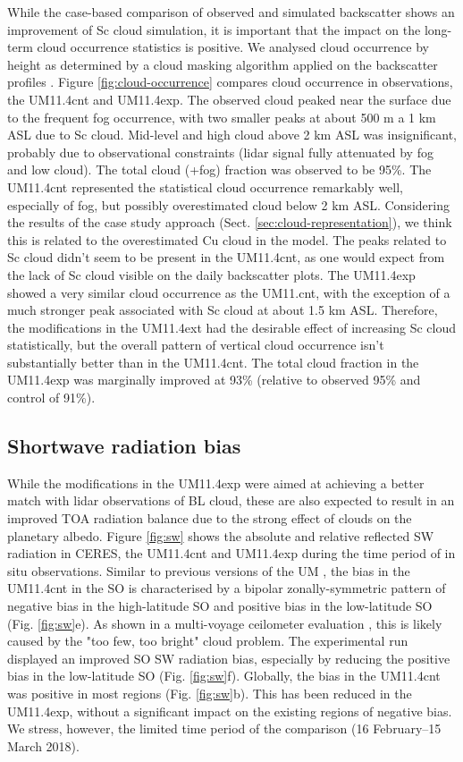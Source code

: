 While the case-based comparison of observed and simulated backscatter
shows an improvement of Sc cloud simulation, it is important that the impact
on the long-term cloud occurrence statistics is positive. We analysed
cloud occurrence by height as determined by a cloud masking algorithm
applied on the backscatter profiles \citep{kuma2020}.
Figure \ref{fig:cloud-occurrence} compares cloud occurrence in observations,
the UM11.4cnt and UM11.4exp. The observed cloud peaked near the surface due to
the frequent fog occurrence,
with two smaller peaks at about 500 m a 1 km ASL due to Sc cloud.
Mid-level and high cloud above 2 km ASL was insignificant, probably due
to observational constraints (lidar signal fully attenuated by fog and low
cloud). The total cloud (+fog) fraction was observed to be 95\%.
The UM11.4cnt represented the statistical cloud occurrence remarkably well,
especially of fog, but possibly overestimated cloud below 2 km ASL. Considering
the results of the case study approach (Sect. \ref{sec:cloud-representation}), we think this is related to the
overestimated Cu cloud in the model. The peaks related to Sc cloud didn't seem
to be present in the UM11.4cnt, as one would expect from the lack of Sc cloud
visible on the daily backscatter plots. The UM11.4exp showed a very similar
cloud occurrence as the UM11.cnt, with the exception of a much stronger peak
associated with Sc cloud at about 1.5 km ASL. Therefore, the modifications
in the UM11.4ext had the desirable effect of increasing Sc cloud statistically,
but the overall pattern of vertical cloud occurrence isn't substantially better
than in the UM11.4cnt. The total cloud fraction in the UM11.4exp was marginally
improved at 93\% (relative to observed 95\% and control of 91\%).

\subsection{Shortwave radiation bias}
\label{sec:sw-bias}

While the modifications in the UM11.4exp were aimed at achieving a better
match with lidar observations of BL cloud, these are also expected to
result in an improved TOA radiation balance due to the strong effect of
clouds on the planetary albedo. Figure \ref{fig:sw} shows the absolute
and relative reflected SW radiation in CERES, the UM11.4cnt and UM11.4exp
during the time period of in situ observations. Similar to previous
versions of the UM \citep{kuma2019,schuddeboom2019}, the bias in the UM11.4cnt
in the SO is characterised by a bipolar zonally-symmetric pattern of negative
bias in the high-latitude SO
and positive bias in the low-latitude SO (Fig. \ref{fig:sw}e).
As shown in a multi-voyage ceilometer
evaluation \citep{kuma2019}, this is likely caused by the "too few, too bright"
cloud problem. The experimental run displayed an improved SO SW radiation
bias, especially by reducing the positive bias in the low-latitude SO
(Fig. \ref{fig:sw}f). Globally, the bias in the UM11.4cnt was positive in most
regions (Fig. \ref{fig:sw}b). This has been reduced in the UM11.4exp, without
a significant impact on the existing regions of negative bias. We stress,
however, the limited time period of the comparison (16 February--15 March 2018).

